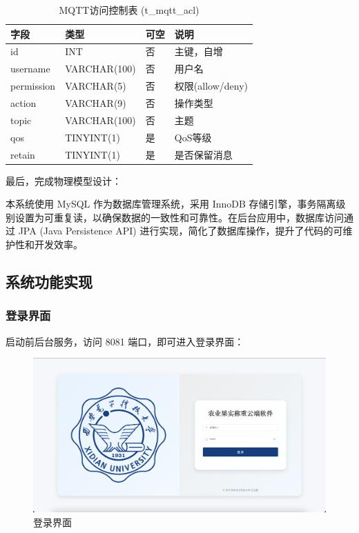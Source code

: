 \documentclass{xduugmr}
\begin{document}
\begin{table}[H]
    \centering
    \caption{MQTT访问控制表 (t\_mqtt\_acl)}
    \begin{tabular}{|l|l|l|l|}
        \hline
        \textbf{字段} & \textbf{类型} & \textbf{可空} & \textbf{说明} \\
        \hline
        id & INT & 否 & 主键，自增 \\
        username & VARCHAR(100) & 否 & 用户名 \\
        permission & VARCHAR(5) & 否 & 权限(allow/deny) \\
        action & VARCHAR(9) & 否 & 操作类型 \\
        topic & VARCHAR(100) & 否 & 主题 \\
        qos & TINYINT(1) & 是 & QoS等级 \\
        retain & TINYINT(1) & 是 & 是否保留消息 \\
        \hline
    \end{tabular}
\end{table}

最后，完成物理模型设计：

本系统使用 MySQL 作为数据库管理系统，采用 InnoDB 存储引擎，事务隔离级别设置为可重复读，以确保数据的一致性和可靠性。在后台应用中，数据库访问通过 JPA (Java Persistence API) 进行实现，简化了数据库操作，提升了代码的可维护性和开发效率。

\subsection{系统功能实现}
\subsubsection{登录界面}

启动前后台服务，访问 8081 端口，即可进入登录界面：

\begin{figure}[H]
    \centering
    \includegraphics[width=0.8\linewidth]{../result/登录界面.png}
    \caption{登录界面}
    \label{fig:登录界面}
\end{figure}
\end{document}
